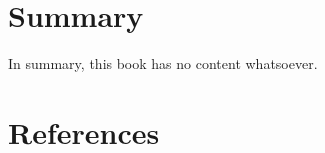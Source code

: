 \documentclass[
  letterpaper,
  DIV=11,
  numbers=noendperiod]{scrreprt}
\begin{document}

\chapter{Summary}\label{summary}

In summary, this book has no content whatsoever.


\chapter*{References}\label{references}


\label{refs}
\end{document}

